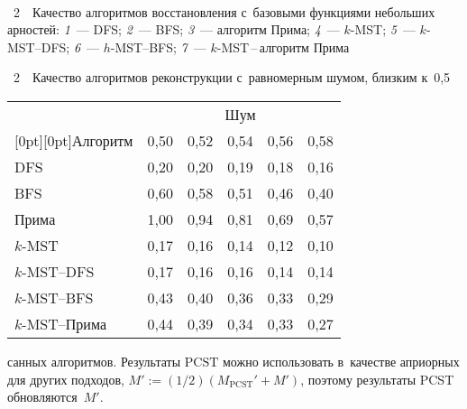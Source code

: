 \begin{multicols}{2}
{ \begin{center}  %
 \vspace*{9pt}
    \mbox{%
\epsfxsize=79mm
}
\end{center}



\noindent
{{\figurename~2}\ \ \small{Качество алгоритмов восстановления с~базовыми функциями небольших 
арностей: \textit{1}~--- DFS; \textit{2}~--- BFS; \textit{3}~--- алгоритм Прима;
\textit{4}~--- $k$-MST; \textit{5}~--- $k$-MST--DFS; \textit{6}~--- $h$-MST--BFS; \textit{7}~--- $k$-MST\,--\,ал\-го\-ритм Прима
}}}

\vspace*{6pt}

\addtocounter{figure}{1}

\begin{center}
\parbox{75mm}{{{\tablename~2}\ \ \small{Качество алгоритмов реконструкции с~равномерным шумом, близким 
к~0,5
}}
}
    
    
\vspace*{6pt}

  {\small  \begin{tabular}{|l|ccccc|}
      \hline
                  & \multicolumn{5}{c|}{Шум}\\%
       \cline{2-6}
        \multicolumn{1}{|c|}{\raisebox{6pt}[0pt][0pt]{Алгоритм}}                          
&0,50&0,52&0,54&0,56&0,58\\
                    \hline
      DFS        &0,20 &0,20 &0,19 &0,18 &0,16\\
      BFS        &0,60 &0,58 &0,51 &0,46 &0,40\\
      Прима    &1,00 &0,94&0,81&0,69&0,57\\
      $k$-MST     &0,17 &0,16 &0,14 &0,12 &0,10\\
      $k$-MST--DFS   &0,17 &0,16 &0,16 &0,14 &0,14 \\
      $k$-MST--BFS   &0,43 &0,40 &0,36 &0,33 &0,29 \\
      $k$-MST--Прима  &0,44 &0,39 &0,34 &0,33 &0,27 \\
      \hline
    \end{tabular}
    }
\end{center}




\noindent
 санных алгоритмов. Результаты 
$\text{PCST}$ можно использовать в~качестве априорных для других подходов, $M':=({1}/{2})(M_{\mathrm{PCST}}' + M')$,
поэтому результаты \mbox{PCST} обновляются~$M'$.



\end{multicols}
